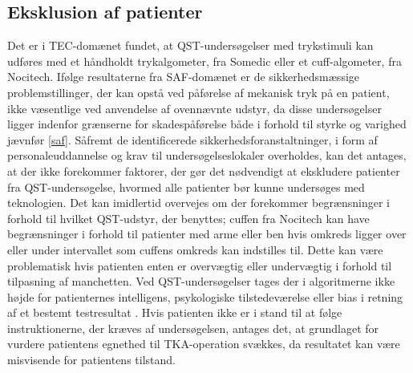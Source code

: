 \subsection{Eksklusion af patienter}
Det er i TEC-domænet fundet, at QST-undersøgelser med trykstimuli kan udføres med et håndholdt trykalgometer, fra Somedic eller et cuff-algometer, fra Nocitech. 
Ifølge resultaterne fra SAF-domænet er de sikkerhedsmæssige problemstillinger, der kan opstå ved påførelse af mekanisk tryk på en patient, ikke væsentlige ved anvendelse af ovennævnte udstyr, da disse undersøgelser ligger indenfor grænserne for skadespåførelse både i forhold til styrke og varighed jævnfør \ref{saf}. Såfremt de identificerede sikkerhedsforanstaltninger, i form af personaleuddannelse og krav til undersøgelseslokaler overholdes, kan det antages, at der ikke forekommer faktorer, der gør det nødvendigt at ekskludere patienter fra QST-undersøgelse, hvormed alle patienter bør kunne undersøges med teknologien. Det kan imidlertid overvejes om der forekommer begrænsninger i forhold til hvilket QST-udstyr, der benyttes; cuffen fra Nocitech kan have begrænsninger i forhold til patienter med arme eller ben hvis omkreds ligger over eller under intervallet som cuffens omkreds kan indstilles til. Dette kan være problematisk hvis patienten enten er overvægtig eller undervægtig i forhold til tilpasning af manchetten. Ved QST-undersøgelser tages der i algoritmerne ikke højde for patienternes intelligens, psykologiske tilstedeværelse eller bias i retning af et bestemt testresultat \citep{Dyck1998}.  
Hvis patienten ikke er i stand til at følge instruktionerne, der kræves af undersøgelsen, antages det, at grundlaget for vurdere patientens egnethed til TKA-operation svækkes, da resultatet kan være misvisende for patientens tilstand.


